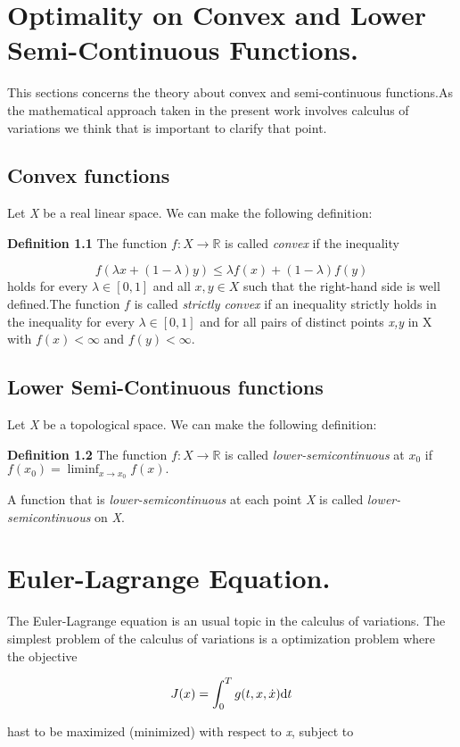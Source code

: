 \section{Optimality on Convex and Lower Semi-Continuous Functions.}
This sections concerns the theory about convex and semi-continuous functions.As the mathematical approach taken in the present work involves calculus of variations we think that is important to clarify that point.

\subsection{Convex functions}
Let \textit{X} be a real linear space. We can make the following definition:

\textbf{Definition 1.1} The function $f: X \rightarrow \mathbb{R}$ is called \textit{convex} if the inequality 

$$f(\lambda x + (1-\lambda)y) \leq \lambda f(x)+(1-\lambda)f(y)$$
holds for every $\lambda \in [0,1]$ and all $x, y \in X$ such that the right-hand side is well defined.The function $f$ is called \textit{strictly convex} if an inequality strictly holds in the inequality for every $\lambda \in [0,1]$ and for all pairs of distinct points \textit{x,y} in X with $f(x)<\infty$ and $f(y)< \infty$.

\subsection{Lower Semi-Continuous functions}
Let \textit{X} be a topological space. We can make the following definition:

\textbf{Definition 1.2} The function $f: X \rightarrow \mathbb{R}$ is called \textit{lower-semicontinuous} at $x_0$ if 
$f(x_0) = \liminf_{x\to x_0} f(x).$

A function that is \textit{lower-semicontinuous} at each point \textit{X} is called \textit{lower-semicontinuous} on \textit{X}.

\section{Euler-Lagrange Equation.}
The Euler-Lagrange equation is an usual topic in the calculus of variations. The simplest problem of the calculus of variations is a optimization problem where the objective 

$$J(x)=\int_{0}^{T} g(t,x,\dot{x})\mathrm{d} t$$

hast to be maximized (minimized) with respect to \textit{x}, subject to 

